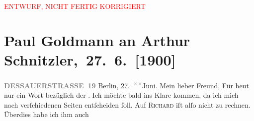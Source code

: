 
\begin{center}
            \textcolor{red}{ENTWURF, NICHT FERTIG KORRIGIERT}
                      \end{center}
            
         
         \renewcommand{\erwaehntePersonen}{Personen: Richard Beer-Hofmann, Georg Hirschfeld, Leo Van-Jung}
         \renewcommand{\erwaehnteInstitutionen}{Institutionen: Houghton Library}
         \renewcommand{\erwaehnteOrte}{Orte: Alpen, Altaussee, Berlin, Dessauer Straße, Salzburg, Sekirn, Südtirol}
         \renewcommand{\erwaehnteWerke}{Werke: Tagebuch}
               \section[ Paul Goldmann an Arthur Schnitzler, 27. 6. {[}1900{]}]{ Paul Goldmann an Arthur Schnitzler, 27. 6. {[}1900{]}}\nopagebreak{}\rehead{ }\begin{ledgroupsized}[t]{13cm}\normalsize\beginnumbering \toendnotes[C]{\smallbreak\pagebreak[2]} 
\toendnotes[C]{\smallbreak}\pstart{}{\pb}\textcolor{gray}{\textbf{DESSAUERSTRASSE 19}}\pend{}{\bigskip}\pstart
           \raggedleft{}Berlin, 27. \substVorne{}\textsuperscript{\textcolor{gray}{×}\-\textcolor{gray}{×}}\substDazwischen{}Ju\substHinten{}ni.\pend
           \pstart\center{}Mein lieber Freund,\pend\pstart
           Für heut nur ein Wort bezüglich der \label{K_L02922-2v}\label{K_L02922-2h}. Ich möchte bald ins Klare kommen, da ich mich nach verſchiedenen Seiten
               entſcheiden ſoll. Auf \textsc{Richard} iſt alſo nicht zu rechnen. Überdies habe ich \strikeout{\textcolor{gray}{an}} ihm auch \label{K_L02922-1v}
\end{ledgroupsized}
